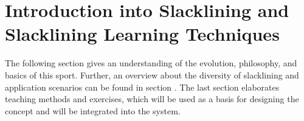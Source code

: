 \chapter{Introduction into Slacklining and Slacklining Learning Techniques}\label{3_slacklining}
The following section \textit{} gives an understanding of the evolution, philosophy, and basics of this sport. Further, an overview about the diversity of slacklining and application scenarios can be found in section \textit{}. The last section \textit{} elaborates teaching methods and exercises, which will be used as a basis for designing the concept and will be integrated into the system.
 
  
  
 
  